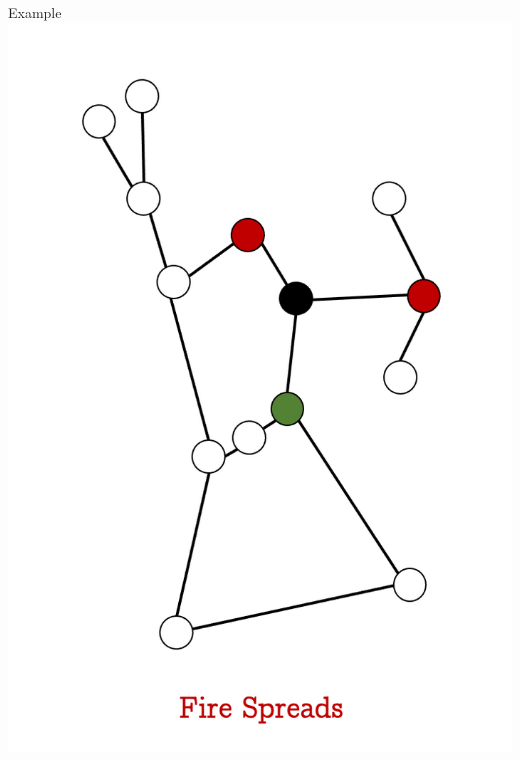 \documentclass[unknownkeysallowed]{beamer}
\begin{document}
\begin{frame}{Example}
\centering\includegraphics[height=0.8\textheight]{assets/eg-fire/3}
\end{frame}
\end{document}
